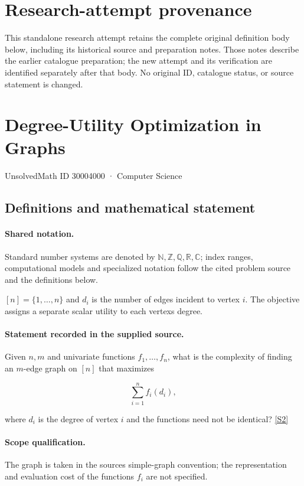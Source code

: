 \documentclass[11pt]{article}
\begin{document}
\section*{Research-attempt provenance}
This standalone research attempt retains the complete original definition body below,
including its historical source and preparation notes. Those notes describe the
earlier catalogue preparation; the new attempt and its verification are identified
separately after that body. No original ID, catalogue status, or source statement is changed.

\section{Degree-Utility Optimization in Graphs}\label{30004000}
{\small UnsolvedMath ID 30004000 · Computer Science}
\subsection{Definitions and mathematical statement}

\paragraph{Shared notation.}Standard number systems are denoted by $\mathbb N,\mathbb Z,\mathbb Q,\mathbb R,\mathbb C$; index ranges, computational models and specialized notation follow the cited problem source and the definitions below.


$[n]=\{1,\ldots,n\}$ and $d_i$ is the number of edges incident to vertex $i$. The objective assigns a separate scalar utility to each vertex\textquotesingle s degree.
\paragraph{Statement recorded in the supplied source.}
Given $n,m$ and univariate functions $f_1,\ldots,f_n$, what is the complexity of finding an $m$-edge graph on $[n]$ that maximizes

$$\sum_{i=1}^nf_i(d_i),$$

where $d_i$ is the degree of vertex $i$ and the functions need not be identical? \href{https://doi.org/10.4171/owr/2018/50}{[S2]}
\paragraph{Scope qualification.}
The graph is taken in the source\textquotesingle s simple-graph convention; the representation and evaluation cost of the functions $f_i$ are not specified.
\end{document}
